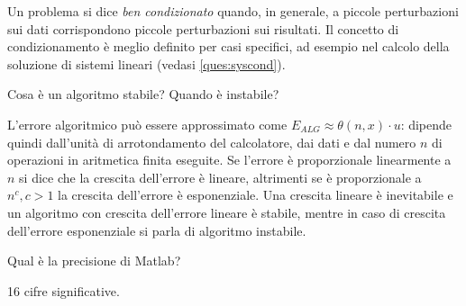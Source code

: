 \documentclass[answers, a4paper]{exam}
\begin{document}
\begin{questions}
	\begin{solution}
		Un problema si dice \textit{ben condizionato} quando, in generale, a piccole perturbazioni sui dati corrispondono piccole perturbazioni sui risultati. 
		Il concetto di condizionamento è meglio definito per casi specifici, ad esempio nel calcolo della soluzione di sistemi lineari (vedasi \ref{ques:syscond}).
	\end{solution}
	\question Cosa è un algoritmo stabile? Quando è instabile?
	\begin{solution}
		L'errore algoritmico può essere approssimato come $E_{ALG} \approx \theta(n, x) \cdot u$: dipende quindi dall'unità di arrotondamento del calcolatore, dai dati e dal numero $n$ di operazioni in aritmetica finita eseguite. 
		Se l'errore è proporzionale linearmente a $n$ si dice che la crescita dell'errore è lineare, altrimenti se è proporzionale a $n^c, c > 1$ la crescita dell'errore è esponenziale.
		Una crescita lineare è inevitabile e un algoritmo con crescita dell'errore lineare è stabile, mentre in caso di crescita dell'errore esponenziale si parla di algoritmo instabile.
	\end{solution}
	\question Qual è la precisione di Matlab?
	\begin{solution}16 cifre significative.\end{solution}

\end{questions}
\end{document}
